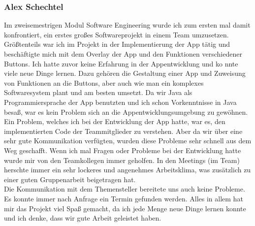 \documentclass{article}
\begin{document}
\subsubsection{Alex Schechtel}
    Im zweisemestrigen Modul Software Engineering wurde ich zum ersten mal damit konfrontiert, ein erstes großes Softwareprojekt in einem Team umzusetzen.
    Größtenteils war ich im Projekt in der Implementierung der App tätig und beschäftigte mich mit dem Overlay der App und den Funktionen verschiedener Buttons.
    Ich hatte zuvor keine Erfahrung in der Appentwicklung und ko    nnte viele neue Dinge lernen.
    Dazu gehören die Gestaltung einer App und Zuweisung von Funktionen an die Buttons,
    aber auch wie man ein komplexes Softwaresystem plant und am besten umsetzt. 
    Da wir Java als Programmiersprache der App benutzten und ich schon Vorkenntnisse in Java besaß, 
    war es kein Problem sich an die Appentwicklungsumgebung zu gewöhnen.\\ 
    Ein Problem, welches ich bei der Entwicklung der App hatte, war es, den implementierten Code der Teammitglieder zu verstehen.
    Aber da wir über eine sehr gute Kommunikation verfügten, wurden diese Probleme sehr schnell aus dem Weg geschafft.
    Wenn ich mal Fragen oder Probleme bei der Entwicklung hatte wurde mir von den Teamkollegen immer geholfen.
    In den Meetings (im Team) herschte immer ein sehr lockeres und angenehmes Arbeitsklima, 
    was zusätzlich zu einer guten Gruppenarbeit beigetragen hat. \\
    Die Kommunikation mit dem Themensteller bereitete uns auch keine Probleme. Es konnte immer nach Anfrage ein Termin gefunden werden. 
    Alles in allem hat mir das Projekt viel Spaß gemacht, da ich jede Menge neue Dinge lernen konnte und ich denke, 
    dass wir gute Arbeit geleistet haben.
\end{document}
